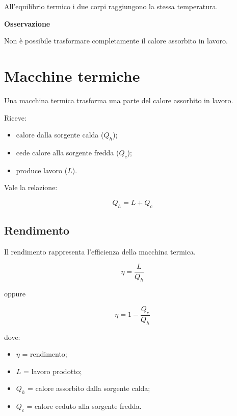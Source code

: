 \vspace{0.3cm}

\noindent All'equilibrio termico i due corpi raggiungono la stessa temperatura.

\vspace{0.3cm}

\noindent\textbf{Osservazione}

\noindent Non è possibile trasformare completamente il calore assorbito in lavoro.

\vspace{0.3cm}

\section{Macchine termiche}

\noindent Una macchina termica trasforma una parte del calore assorbito in lavoro.

\vspace{0.3cm}

\noindent Riceve:

\begin{itemize}
    \item calore dalla sorgente calda ($Q_h$);
    \item cede calore alla sorgente fredda ($Q_c$);
    \item produce lavoro ($L$).
\end{itemize}

\noindent Vale la relazione:

\[
Q_h=L+Q_c
\]

\vspace{0.3cm}

\subsection{Rendimento}

\noindent Il rendimento rappresenta l'efficienza della macchina termica.

\[
\eta=\frac{L}{Q_h}
\]

\noindent oppure

\[
\eta=1-\frac{Q_c}{Q_h}
\]

\noindent dove:

\begin{itemize}
    \item $\eta$ = rendimento;
    \item $L$ = lavoro prodotto;
    \item $Q_h$ = calore assorbito dalla sorgente calda;
    \item $Q_c$ = calore ceduto alla sorgente fredda.
\end{itemize}

